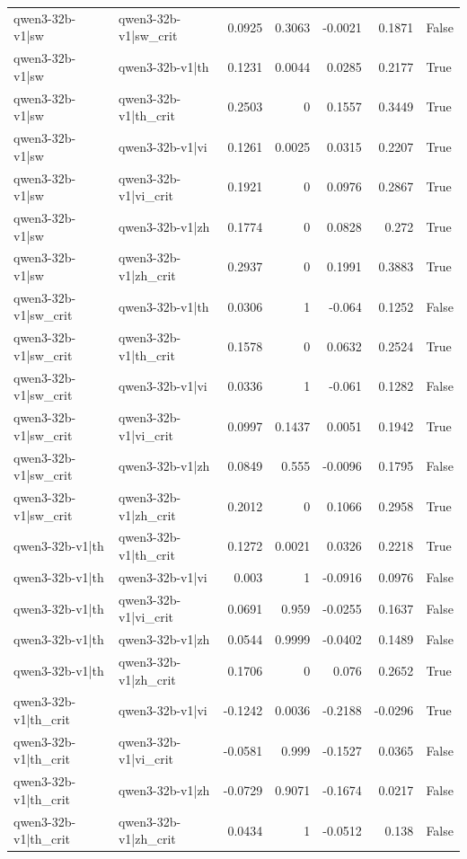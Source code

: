 \begin{table}
\begin{tabular}{l l r r r r l}
qwen3-32b-v1|sw & qwen3-32b-v1|sw_crit & 0.0925 & 0.3063 & -0.0021 & 0.1871 & False \\
qwen3-32b-v1|sw & qwen3-32b-v1|th & 0.1231 & 0.0044 & 0.0285 & 0.2177 & True \\
qwen3-32b-v1|sw & qwen3-32b-v1|th_crit & 0.2503 & 0 & 0.1557 & 0.3449 & True \\
qwen3-32b-v1|sw & qwen3-32b-v1|vi & 0.1261 & 0.0025 & 0.0315 & 0.2207 & True \\
qwen3-32b-v1|sw & qwen3-32b-v1|vi_crit & 0.1921 & 0 & 0.0976 & 0.2867 & True \\
qwen3-32b-v1|sw & qwen3-32b-v1|zh & 0.1774 & 0 & 0.0828 & 0.272 & True \\
qwen3-32b-v1|sw & qwen3-32b-v1|zh_crit & 0.2937 & 0 & 0.1991 & 0.3883 & True \\
qwen3-32b-v1|sw_crit & qwen3-32b-v1|th & 0.0306 & 1 & -0.064 & 0.1252 & False \\
qwen3-32b-v1|sw_crit & qwen3-32b-v1|th_crit & 0.1578 & 0 & 0.0632 & 0.2524 & True \\
qwen3-32b-v1|sw_crit & qwen3-32b-v1|vi & 0.0336 & 1 & -0.061 & 0.1282 & False \\
qwen3-32b-v1|sw_crit & qwen3-32b-v1|vi_crit & 0.0997 & 0.1437 & 0.0051 & 0.1942 & True \\
qwen3-32b-v1|sw_crit & qwen3-32b-v1|zh & 0.0849 & 0.555 & -0.0096 & 0.1795 & False \\
qwen3-32b-v1|sw_crit & qwen3-32b-v1|zh_crit & 0.2012 & 0 & 0.1066 & 0.2958 & True \\
qwen3-32b-v1|th & qwen3-32b-v1|th_crit & 0.1272 & 0.0021 & 0.0326 & 0.2218 & True \\
qwen3-32b-v1|th & qwen3-32b-v1|vi & 0.003 & 1 & -0.0916 & 0.0976 & False \\
qwen3-32b-v1|th & qwen3-32b-v1|vi_crit & 0.0691 & 0.959 & -0.0255 & 0.1637 & False \\
qwen3-32b-v1|th & qwen3-32b-v1|zh & 0.0544 & 0.9999 & -0.0402 & 0.1489 & False \\
qwen3-32b-v1|th & qwen3-32b-v1|zh_crit & 0.1706 & 0 & 0.076 & 0.2652 & True \\
qwen3-32b-v1|th_crit & qwen3-32b-v1|vi & -0.1242 & 0.0036 & -0.2188 & -0.0296 & True \\
qwen3-32b-v1|th_crit & qwen3-32b-v1|vi_crit & -0.0581 & 0.999 & -0.1527 & 0.0365 & False \\
qwen3-32b-v1|th_crit & qwen3-32b-v1|zh & -0.0729 & 0.9071 & -0.1674 & 0.0217 & False \\
qwen3-32b-v1|th_crit & qwen3-32b-v1|zh_crit & 0.0434 & 1 & -0.0512 & 0.138 & False \\

\end{tabular}
\end{table}
